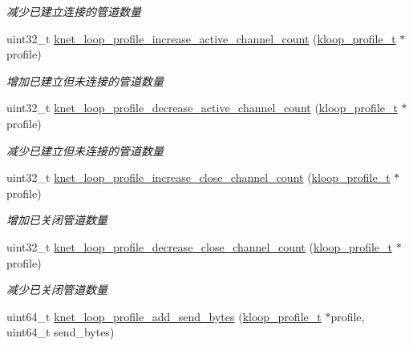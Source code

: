 \begin{DoxyCompactItemize}
\begin{DoxyCompactList}\small\item\em 减少已建立连接的管道数量 \end{DoxyCompactList}\item 
uint32\+\_\+t \hyperlink{a00096_abb04cdf84772d003486afde6ee2f5234_abb04cdf84772d003486afde6ee2f5234}{knet\+\_\+loop\+\_\+profile\+\_\+increase\+\_\+active\+\_\+channel\+\_\+count} (\hyperlink{a00066_ab75a5c23099a6118c469ed160b277f28_ab75a5c23099a6118c469ed160b277f28}{kloop\+\_\+profile\+\_\+t} $\ast$profile)
\begin{DoxyCompactList}\small\item\em 增加已建立但未连接的管道数量 \end{DoxyCompactList}\item 
uint32\+\_\+t \hyperlink{a00096_a2846784b57c724b18c09aa177c1d1905_a2846784b57c724b18c09aa177c1d1905}{knet\+\_\+loop\+\_\+profile\+\_\+decrease\+\_\+active\+\_\+channel\+\_\+count} (\hyperlink{a00066_ab75a5c23099a6118c469ed160b277f28_ab75a5c23099a6118c469ed160b277f28}{kloop\+\_\+profile\+\_\+t} $\ast$profile)
\begin{DoxyCompactList}\small\item\em 减少已建立但未连接的管道数量 \end{DoxyCompactList}\item 
uint32\+\_\+t \hyperlink{a00096_a85fbddaf0bf20c228f7389ad2765ec57_a85fbddaf0bf20c228f7389ad2765ec57}{knet\+\_\+loop\+\_\+profile\+\_\+increase\+\_\+close\+\_\+channel\+\_\+count} (\hyperlink{a00066_ab75a5c23099a6118c469ed160b277f28_ab75a5c23099a6118c469ed160b277f28}{kloop\+\_\+profile\+\_\+t} $\ast$profile)
\begin{DoxyCompactList}\small\item\em 增加已关闭管道数量 \end{DoxyCompactList}\item 
uint32\+\_\+t \hyperlink{a00096_a1c0e93ef936d34b9ed9eb0b8a949a888_a1c0e93ef936d34b9ed9eb0b8a949a888}{knet\+\_\+loop\+\_\+profile\+\_\+decrease\+\_\+close\+\_\+channel\+\_\+count} (\hyperlink{a00066_ab75a5c23099a6118c469ed160b277f28_ab75a5c23099a6118c469ed160b277f28}{kloop\+\_\+profile\+\_\+t} $\ast$profile)
\begin{DoxyCompactList}\small\item\em 减少已关闭管道数量 \end{DoxyCompactList}\item 
uint64\+\_\+t \hyperlink{a00096_abd775461437b9c394cf7b800953ea6d0_abd775461437b9c394cf7b800953ea6d0}{knet\+\_\+loop\+\_\+profile\+\_\+add\+\_\+send\+\_\+bytes} (\hyperlink{a00066_ab75a5c23099a6118c469ed160b277f28_ab75a5c23099a6118c469ed160b277f28}{kloop\+\_\+profile\+\_\+t} $\ast$profile, uint64\+\_\+t send\+\_\+bytes)

\end{DoxyCompactItemize}
